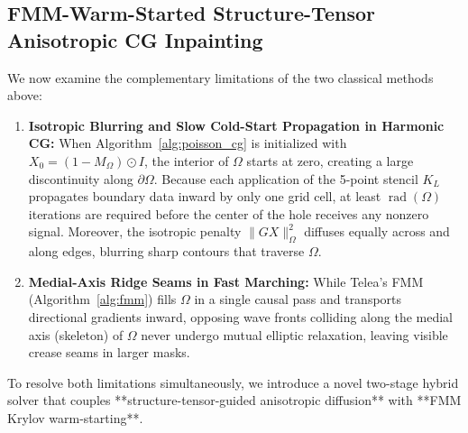 \documentclass{amsart}
\begin{document}
\subsection{FMM-Warm-Started Structure-Tensor Anisotropic CG Inpainting}\label{sec_hybrid}

We now examine the complementary limitations of the two classical methods above:
\begin{enumerate}
    \item \textbf{Isotropic Blurring and Slow Cold-Start Propagation in Harmonic CG:} When Algorithm~\ref{alg:poisson_cg} is initialized with $X_0 = (1 - M_\Omega) \odot I$, the interior of $\Omega$ starts at zero, creating a large discontinuity along $\partial\Omega$. Because each application of the 5-point stencil $K_L$ propagates boundary data inward by only one grid cell, at least $\operatorname{rad}(\Omega)$ iterations are required before the center of the hole receives any nonzero signal. Moreover, the isotropic penalty $\|G X\|_\Omega^2$ diffuses equally across and along edges, blurring sharp contours that traverse $\Omega$.
    \item \textbf{Medial-Axis Ridge Seams in Fast Marching:} While Telea's FMM (Algorithm~\ref{alg:fmm}) fills $\Omega$ in a single causal pass and transports directional gradients inward, opposing wave fronts colliding along the medial axis (skeleton) of $\Omega$ never undergo mutual elliptic relaxation, leaving visible crease seams in larger masks.
\end{enumerate}

To resolve both limitations simultaneously, we introduce a novel two-stage hybrid solver that couples **structure-tensor-guided anisotropic diffusion** with **FMM Krylov warm-starting**.
\end{document}
